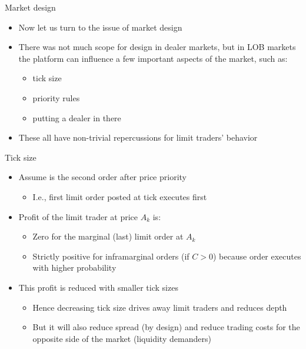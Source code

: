\documentclass[english,10pt]{beamer}
\begin{document}
\begin{frame}{Market design}
	\begin{itemize}
		\item Now let us turn to the issue of \alert{market design}
		\item There was not much scope for design in dealer markets, but in LOB markets the platform can influence a few important aspects of the market, such as:
		\begin{itemize}
			\item tick size
			\item priority rules
			\item putting a dealer in there
		\end{itemize}
		\item These all have non-trivial repercussions for limit traders' behavior
	\end{itemize}
\end{frame}


\begin{frame}{Tick size}
	\begin{itemize}
		\item Assume  is the second order after price priority
		\begin{itemize}
			\item I.e., first limit order posted at tick executes first
		\end{itemize}
		\item Profit of the limit trader at price $A_k$ is:
		\begin{itemize}
			\item Zero for the marginal (last) limit order at $A_k$
			\item Strictly positive for inframarginal orders (if $C>0$) because order executes with higher probability
		\end{itemize}
		\item This profit is reduced with \alert{smaller tick sizes}
		\begin{itemize}
			\item Hence decreasing tick size drives away limit traders and reduces depth
			\item But it will also reduce spread (by design) and reduce trading costs for the opposite side of the market (liquidity demanders)
		\end{itemize}
	\end{itemize}
\end{frame}
\end{document}
